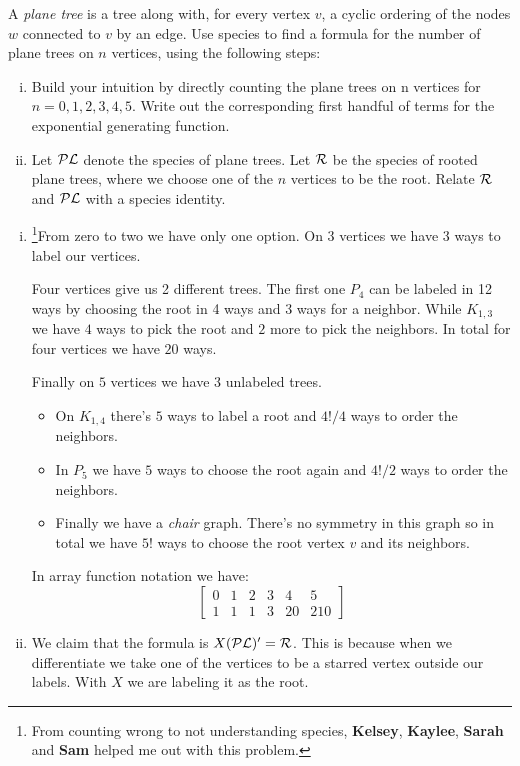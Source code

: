 \documentclass[12pt]{memoir}
\begin{document}
\begin{Ej}
    A \emph{plane tree} is a tree along with, for every vertex $v$, a cyclic ordering of the nodes $w$ connected to $v$ by
an edge. Use species to find a formula for the number of plane trees on $n$ vertices, using the following
steps:
\begin{enumerate}[i)]
    \itemsep=-0.4em 
    \item Build your intuition by directly counting the plane trees on n vertices for $n =
    0, 1, 2, 3, 4, 5$. Write out the corresponding first handful of terms for the exponential generating function.
    \item Let $\mathcal{P}\mathcal{L}$ denote the species of plane trees. Let $\mathcal{R}$ be the species of rooted plane trees, where we choose one of the $n$ vertices to be the root. Relate $\mathcal{R}$ and $\mathcal{P}\mathcal{L}$ with a species identity.
\end{enumerate}
\end{Ej}

\begin{ptcbr}
    \begin{enumerate}[i)]
        \itemsep=-0.4em
        \item \footnote{From counting wrong to not understanding species, \textbf{Kelsey}, \textbf{Kaylee}, \textbf{Sarah} and \textbf{Sam} helped me out with this problem.}From zero to two we have only one option. On 3 vertices we have 3 ways to label our vertices.\par 
        Four vertices give us 2 different trees. The first one $P_4$ can be labeled in 12 ways by choosing the root in 4 ways and 3 ways for a neighbor. While $K_{1,3}$ we have $4$ ways to pick the root and $2$ more to pick the neighbors. In total for four vertices we have $20$ ways.\par 
        Finally on $5$ vertices we have $3$ unlabeled trees.
        \begin{itemize}
            \itemsep=-0.4em
            \item On $K_{1,4}$ there's $5$ ways to label a root and $4!/4$ ways to order the neighbors. 
            \item In $P_5$ we have $5$ ways to choose the root again and $4!/2$ ways to order the neighbors. 
            \item Finally we have a \emph{chair} graph. There's no symmetry in this graph so in total we have $5!$ ways to choose the root vertex $v$ and its neighbors.
        \end{itemize}
        In array function notation we have:
        $$\begin{bmatrix}
            0&1&2&3&4&5\\
            1&1&1&3&20&210
        \end{bmatrix}$$
        \item We claim that the formula is $X(\mathcal{P}\mathcal{L})'=\mathcal{R}$. This is because when we differentiate we take one of the vertices to be a starred vertex outside our labels. With $X$ we are labeling it as the root.
    \end{enumerate}
\end{ptcbr}
\end{document}
